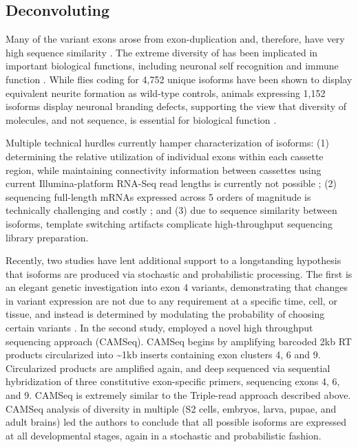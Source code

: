 	\subsection{Deconvoluting \dscam{}}

		Many of the \dscam{} variant exons arose from exon-duplication and, therefore, have very high sequence similarity \citep{Lee2010b}. The extreme diversity of \dscam{} has been implicated in important biological functions, including neuronal self recognition and immune function \citep{Wojtowicz2004,LawrenceZipursky2013,Watson2005}. While flies coding for 4,752 unique isoforms have been shown to display equivalent neurite formation as wild-type controls, animals expressing 1,152 isoforms display neuronal branding defects, supporting the view that diversity of molecules, and not sequence, is essential for biological function \citep{Hattori2009}.

		Multiple technical hurdles currently hamper characterization of \dscam{} isoforms: (1) determining the relative utilization of individual exons within each cassette region, while maintaining connectivity information between cassettes using current Illumina-platform RNA-Seq read lengths is currently not possible \citep{Neves2004,LawrenceZipursky2013,LeGault2013}; (2) sequencing full-length mRNAs expressed across 5 orders of magnitude is technically challenging and costly \citep{Hattori2008,Sharon2013}; and (3) due to sequence similarity between \dscam{} isoforms, template switching artifacts complicate high-throughput sequencing library preparation.

		Recently, two studies have lent additional support to a longstanding hypothesis that \dscam{} isoforms are produced via stochastic and probabilistic processing. The first is an elegant genetic investigation into exon 4 variants, demonstrating that changes in variant expression are not due to any requirement at a specific time, cell, or tissue, and instead is determined by modulating the probability of choosing certain variants \citep{Miura2013b}. In the second study, \citet{Sun2013} employed a novel high throughput sequencing approach (CAMSeq). CAMSeq begins by amplifying barcoded 2kb \dscam{} RT products circularized into \textasciitilde 1kb inserts containing exon clusters 4, 6 and 9. Circularized products are amplified again, and deep sequenced via sequential hybridization of three constitutive exon-specific primers, sequencing exons 4, 6, and 9. CAMSeq is extremely similar to the Triple-read approach described above. CAMSeq analysis of \dscam{} diversity in multiple \flies{} (S2 cells, embryos, larva, pupae, and adult brains) led the authors to conclude that all possible isoforms are expressed at all developmental stages, again in a stochastic and probabilistic fashion.

